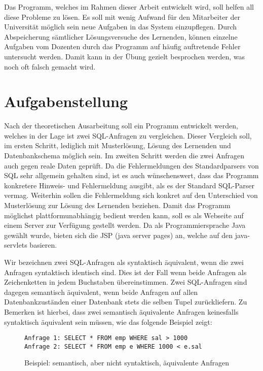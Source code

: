 Das Programm, welches im Rahmen dieser Arbeit entwickelt wird, soll helfen all diese Probleme zu lösen. Es soll mit wenig Aufwand für den Mitarbeiter der Universität möglich sein neue Aufgaben in das System einzupflegen. Durch Abspeicherung sämtlicher Lösungsversuche des Lernenden, können einzelne Aufgaben vom Dozenten durch das Programm auf häufig auftretende Fehler untersucht werden. Damit kann in der Übung gezielt besprochen werden, was noch oft falsch gemacht wird.

\section{Aufgabenstellung}

Nach der theoretischen Ausarbeitung soll ein Programm entwickelt werden, welches in der Lage ist zwei SQL-Anfragen zu vergleichen. Dieser Vergleich soll, im ersten Schritt, lediglich mit Musterlösung, Lösung des Lernenden und Datenbankschema möglich sein. Im zweiten Schritt werden die zwei Anfragen auch gegen reale Daten geprüft. Da die Fehlermeldungen des Standardparsers von SQL sehr allgemein gehalten sind, ist es auch wünschenswert, dass das Programm konkretere Hinweis- und Fehlermeldung ausgibt, als es der Standard SQL-Parser vermag. Weiterhin sollen die Fehlermeldung sich konkret auf den Unterschied von Musterlösung zur Lösung des Lernenden beziehen. Damit das Programm möglichst plattformunabhängig bedient werden kann, soll es als Webseite auf einem Server zur Verfügung gestellt werden. Da als Programmiersprache Java gewählt wurde, bieten sich die JSP (java server pages) an, welche auf den java-servlets basieren.

Wir bezeichnen zwei SQL-Anfragen als syntaktisch äquivalent, wenn die zwei Anfragen syntaktisch identisch sind. Dies ist der Fall wenn beide Anfragen als Zeichenketten in jedem Buchstaben übereinstimmen. Zwei SQL-Anfragen sind dagegen semantisch äquivalent, wenn beide Anfragen auf allen Datenbankzuständen einer Datenbank stets die selben Tupel zurückliefern. Zu Bemerken ist hierbei, dass zwei semantisch äquivalente Anfragen keinesfalls syntaktisch äquivalent sein müssen, wie das folgende Beispiel zeigt:

\begin{figure}[h]
\begin{verbatim}
Anfrage 1: SELECT * FROM emp WHERE sal > 1000
Anfrage 2: SELECT * FROM emp e WHERE 1000 < e.sal
\end{verbatim}
\caption{Beispiel: semantisch, aber nicht syntaktisch, äquivalente Anfragen}
\end{figure}

